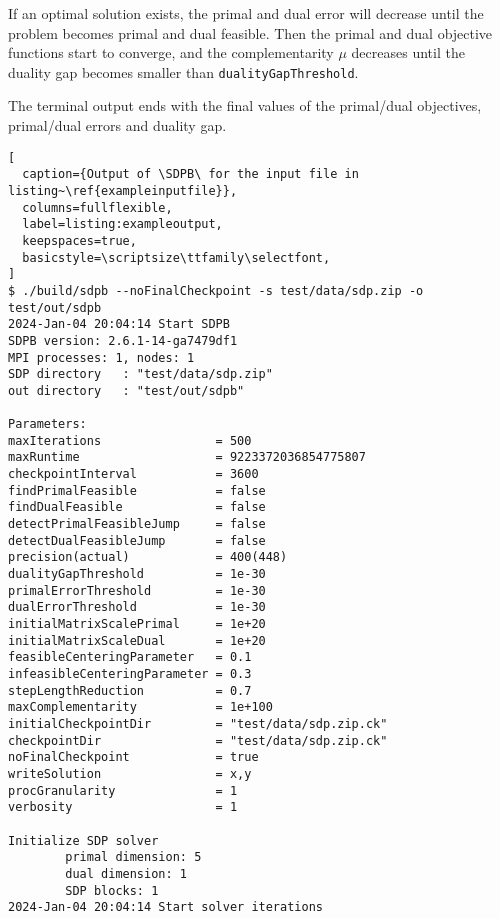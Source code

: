 \documentclass[12pt]{article}
\numberwithin{equation}{section}
\newcommand\SDPB{\texttt{SDPB}}
\begin{document}
If an optimal solution exists, the primal and dual error will decrease until the problem becomes primal and dual feasible.  Then the primal and dual objective functions start to converge, and the complementarity $\mu$ decreases until the duality gap becomes smaller than \texttt{dualityGapThreshold}.

The terminal output ends with the final values of the primal/dual objectives, primal/dual errors and duality gap.

\begin{lstlisting}[
  caption={Output of \SDPB\ for the input file in listing~\ref{exampleinputfile}},
  columns=fullflexible,
  label=listing:exampleoutput,
  keepspaces=true,
  basicstyle=\scriptsize\ttfamily\selectfont,
]
$ ./build/sdpb --noFinalCheckpoint -s test/data/sdp.zip -o test/out/sdpb
2024-Jan-04 20:04:14 Start SDPB
SDPB version: 2.6.1-14-ga7479df1
MPI processes: 1, nodes: 1
SDP directory   : "test/data/sdp.zip"
out directory   : "test/out/sdpb"

Parameters:
maxIterations                = 500
maxRuntime                   = 9223372036854775807
checkpointInterval           = 3600
findPrimalFeasible           = false
findDualFeasible             = false
detectPrimalFeasibleJump     = false
detectDualFeasibleJump       = false
precision(actual)            = 400(448)
dualityGapThreshold          = 1e-30
primalErrorThreshold         = 1e-30
dualErrorThreshold           = 1e-30
initialMatrixScalePrimal     = 1e+20
initialMatrixScaleDual       = 1e+20
feasibleCenteringParameter   = 0.1
infeasibleCenteringParameter = 0.3
stepLengthReduction          = 0.7
maxComplementarity           = 1e+100
initialCheckpointDir         = "test/data/sdp.zip.ck"
checkpointDir                = "test/data/sdp.zip.ck"
noFinalCheckpoint            = true
writeSolution                = x,y
procGranularity              = 1
verbosity                    = 1

Initialize SDP solver
        primal dimension: 5
        dual dimension: 1
        SDP blocks: 1
2024-Jan-04 20:04:14 Start solver iterations


\end{lstlisting}
\end{document}
